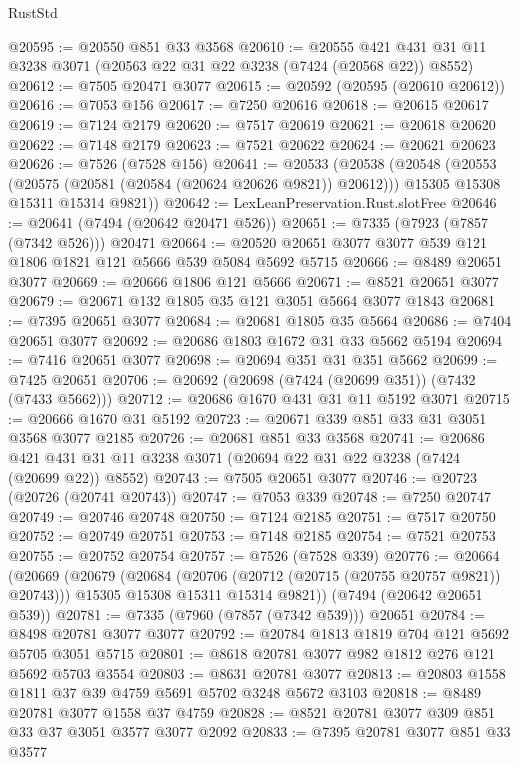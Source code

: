 \begin{lexlean}{RustStd}
\begin{coremodule}
@20595 := @20550 @851 @33 @3568
@20610 := @20555 @421 @431 @31 @11 @3238 @3071 (@20563 @22 @31 @22 @3238 (@7424 (@20568 @22)) @8552)
@20612 := @7505 @20471 @3077
@20615 := @20592 (@20595 (@20610 @20612))
@20616 := @7053 @156
@20617 := @7250 @20616
@20618 := @20615 @20617
@20619 := @7124 @2179
@20620 := @7517 @20619
@20621 := @20618 @20620
@20622 := @7148 @2179
@20623 := @7521 @20622
@20624 := @20621 @20623
@20626 := @7526 (@7528 @156)
@20641 := @20533
    (@20538
      (@20548
        (@20553 (@20575 (@20581 (@20584 (@20624 @20626 @9821)) @20612)))
        @15305
        @15308
        @15311
        @15314
        @9821))
@20642 := LexLeanPreservation.Rust.slotFree
@20646 := @20641 (@7494 (@20642 @20471 @526))
@20651 := @7335 (@7923 (@7857 (@7342 @526))) @20471
@20664 := @20520 @20651 @3077 @3077 @539 @121 @1806 @1821 @121 @5666 @539 @5084 @5692 @5715
@20666 := @8489 @20651 @3077
@20669 := @20666 @1806 @121 @5666
@20671 := @8521 @20651 @3077
@20679 := @20671 @132 @1805 @35 @121 @3051 @5664 @3077 @1843
@20681 := @7395 @20651 @3077
@20684 := @20681 @1805 @35 @5664
@20686 := @7404 @20651 @3077
@20692 := @20686 @1803 @1672 @31 @33 @5662 @5194
@20694 := @7416 @20651 @3077
@20698 := @20694 @351 @31 @351 @5662
@20699 := @7425 @20651
@20706 := @20692 (@20698 (@7424 (@20699 @351)) (@7432 (@7433 @5662)))
@20712 := @20686 @1670 @431 @31 @11 @5192 @3071
@20715 := @20666 @1670 @31 @5192
@20723 := @20671 @339 @851 @33 @31 @3051 @3568 @3077 @2185
@20726 := @20681 @851 @33 @3568
@20741 := @20686 @421 @431 @31 @11 @3238 @3071 (@20694 @22 @31 @22 @3238 (@7424 (@20699 @22)) @8552)
@20743 := @7505 @20651 @3077
@20746 := @20723 (@20726 (@20741 @20743))
@20747 := @7053 @339
@20748 := @7250 @20747
@20749 := @20746 @20748
@20750 := @7124 @2185
@20751 := @7517 @20750
@20752 := @20749 @20751
@20753 := @7148 @2185
@20754 := @7521 @20753
@20755 := @20752 @20754
@20757 := @7526 (@7528 @339)
@20776 := @20664
    (@20669
      (@20679
        (@20684 (@20706 (@20712 (@20715 (@20755 @20757 @9821)) @20743)))
        @15305
        @15308
        @15311
        @15314
        @9821))
    (@7494 (@20642 @20651 @539))
@20781 := @7335 (@7960 (@7857 (@7342 @539))) @20651
@20784 := @8498 @20781 @3077 @3077
@20792 := @20784 @1813 @1819 @704 @121 @5692 @5705 @3051 @5715
@20801 := @8618 @20781 @3077 @982 @1812 @276 @121 @5692 @5703 @3554
@20803 := @8631 @20781 @3077
@20813 := @20803 @1558 @1811 @37 @39 @4759 @5691 @5702 @3248 @5672 @3103
@20818 := @8489 @20781 @3077 @1558 @37 @4759
@20828 := @8521 @20781 @3077 @309 @851 @33 @37 @3051 @3577 @3077 @2092
@20833 := @7395 @20781 @3077 @851 @33 @3577

\end{coremodule}
\end{lexlean}
